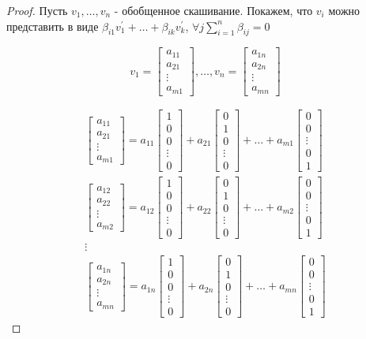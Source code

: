 \documentclass[fontsize=14pt]{scrartcl}
\theoremstyle{definition}
\begin{document}
\begin{proof}
	Пусть $v_1, \dots, v_n$ - обобщенное скашивание. Покажем, что $v_i$ можно представить в виде $\beta_{i1}v^{'}_1 + \dots + \beta_{ik}v^{'}_k$, $\forall j \sum_{i=1}^n\beta_{ij} = 0 $
\\
\def\vf{
\begin{bmatrix}
    a_{11} \\
    a_{21} \\
    \vdots \\
    a_{m1}
\end{bmatrix}}

\def\vs{
\begin{bmatrix}
    a_{12} \\
    a_{22} \\
    \vdots \\
    a_{m2}
\end{bmatrix}}

\def\vn{
\begin{bmatrix}
    a_{1n} \\
    a_{2n} \\
    \vdots \\
    a_{mn}
\end{bmatrix}}

\def\basef{
\begin{bmatrix}
    1 \\
    0 \\
    0 \\
    \vdots \\
    0
\end{bmatrix}}

\def\bases{
\begin{bmatrix}
    0 \\
    1 \\
    0 \\
    \vdots \\
    0
\end{bmatrix}}

\def\basem{
\begin{bmatrix}
    0 \\
    0 \\
    \vdots \\
    0 \\
    1
\end{bmatrix}}

\begin{equation}
v_1 = \vf, \dots, v_n = \vn
\end{equation}

\begin{align*} 
\vf = a_{11}\basef + a_{21}\bases + \dots + a_{m1}\basem
\\
\vs = a_{12}\basef + a_{22}\bases + \dots + a_{m2}\basem
\\
\vdots
\\
\vn = a_{1n}\basef + a_{2n}\bases + \dots + a_{mn}\basem
\end{align*}


\end{proof}
\end{document}
